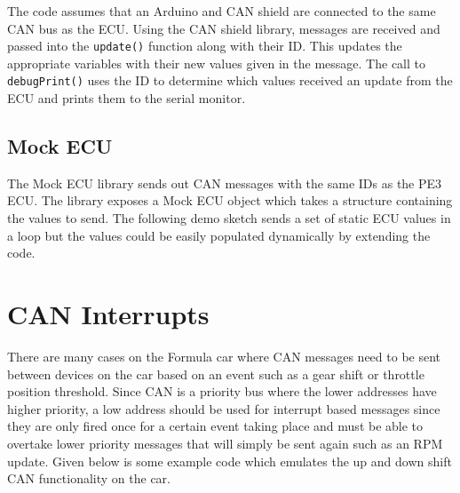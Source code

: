 \documentclass[letterpaper]{article}
\begin{document}
\lstset{basicstyle=\ttfamily\scriptsize}

\lstset{basicstyle=\ttfamily}

The code assumes that an Arduino and CAN shield are connected to the same CAN
bus as the ECU. Using the CAN shield library, messages are received and passed
into the \lstinline{update()} function along with their ID. This updates the
appropriate variables with their new values given in the message. The call to
\lstinline{debugPrint()} uses the ID to determine which values received an
update from the ECU and prints them to the serial monitor.

\subsection{Mock ECU}
The Mock ECU library sends out CAN messages with the same IDs as the PE3 ECU.
The library exposes a Mock ECU object which takes a structure containing the values
to send. The following demo sketch sends a set of static ECU values in a loop
but the values could be easily populated dynamically by extending the code.

\lstset{basicstyle=\ttfamily\scriptsize}


\section{CAN Interrupts}
There are many cases on the Formula car where CAN messages need to be sent
between devices on the car based on an event such as a gear shift or throttle
position threshold. Since CAN is a priority bus where the lower addresses have
higher priority, a low address should be used for interrupt based messages since
they are only fired once for a certain event taking place and must be able to
overtake lower priority messages that will simply be sent again such as an RPM
update. Given below is some example code which emulates the up and down shift
CAN functionality on the car.\\
\\
\\


\lstset{basicstyle=\ttfamily}
\end{document}
